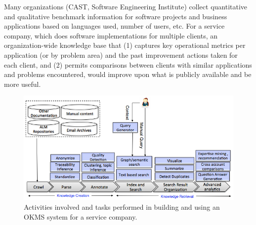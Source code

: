 Many organizations (\eg CAST, Software Engineering Institute) collect
quantitative and qualitative benchmark information for software projects and
business applications based on languages used, number of users, etc.  For a
service company, which does software implementations for multiple clients, an
organization-wide knowledge base that (1) captures key operational metrics per
application (or by problem area) and the past improvement actions taken for each
client, and (2) permits comparisons between clients with similar applications
and problems encountered, would improve upon what is publicly available and be
more useful.


\begin{figure}[t]
	\center \includegraphics[width=\columnwidth]{figs/km.png}
        \vspace*{-18pt}
	\caption{Activities involved and tasks performed in building and using
          an OKMS system for a service company.}
        \vspace*{-15pt}
	\label{fig-km}
\end{figure}

